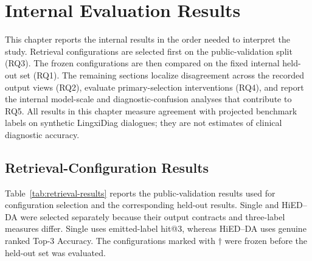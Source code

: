 \chapter{Internal Evaluation Results}
\label{ch:results}

This chapter reports the internal results in the order needed to interpret the study. Retrieval configurations are selected first on the public-validation split (RQ3). The frozen configurations are then compared on the fixed internal held-out set (RQ1). The remaining sections localize disagreement across the recorded output views (RQ2), evaluate primary-selection interventions (RQ4), and report the internal model-scale and diagnostic-confusion analyses that contribute to RQ5. All results in this chapter measure agreement with projected benchmark labels on synthetic LingxiDiag dialogues; they are not estimates of clinical diagnostic accuracy.

\section{Retrieval-Configuration Results}
\label{sec:retrieval-results}

Table~\ref{tab:retrieval-results} reports the public-validation results used for configuration selection and the corresponding held-out results. Single and HiED--DA were selected separately because their output contracts and three-label measures differ. Single uses emitted-label hit@3, whereas HiED--DA uses genuine ranked Top-3 Accuracy. The configurations marked with $\dagger$ were frozen before the held-out set was evaluated.

